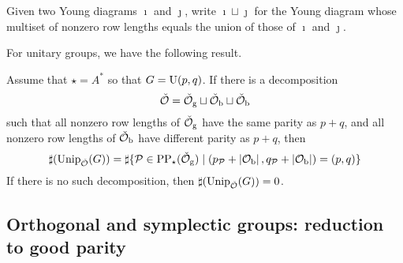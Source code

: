 \documentclass[counting_main.tex]{subfiles}
\begin{document}
Given two Young diagrams $\imath$ and $\jmath$, write $\imath\sqcup \jmath$ for the Young diagram whose multiset of nonzero row lengths equals the union of those of $\imath$ and $\jmath$.

For unitary groups, we have the following result.
\begin{thm}
Assume that $\star=A^*$ so that $G=\operatorname{U}(p,q)$. If there is a decomposition
 \[
   \check {{\mathcal {O}}}=\check {{\mathcal {O}}}_{\mathrm g} \sqcup \check {{\mathcal {O}}}_{\mathrm b}\sqcup \check {{\mathcal {O}}}_{\mathrm b}
 \]
 such that all nonzero row lengths of $\check {{\mathcal {O}}}_{\mathrm g}$ have the same parity as $p+q$, and all nonzero row lengths of $\check {{\mathcal {O}}}_{\mathrm b}$ have different parity as $p+q$, then
 \[
\sharp(\mathrm{Unip}_{\check {{\mathcal {O}}}}(G))=
        \sharp\{\mathcal{P}\in \mathrm{PP}_\star(\check {{\mathcal {O}}}_{\mathrm g})\mid (p_{\mathcal{P}}+\left|{{\mathcal {O}}_{\mathrm b}}\right|, q_{\mathcal{P}}+\left|{{\mathcal {O}}_{\mathrm b}}\right|)=(p,q)\}
        \]
If there is no such decomposition, then $\sharp(\mathrm{Unip}_{\check {{\mathcal {O}}}}(G))=0$.

\end{thm}

\subsection{Orthogonal and symplectic groups: reduction to good parity}
\end{document}
